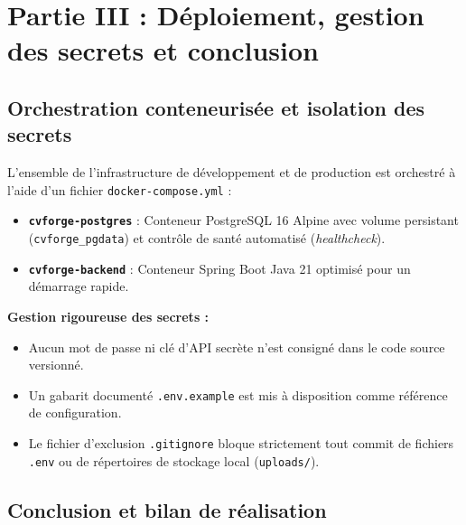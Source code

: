 \documentclass[11pt,a4paper]{article}
\begin{document}
\newpage

\section{Partie III : Déploiement, gestion des secrets et conclusion}

\subsection{Orchestration conteneurisée et isolation des secrets}

L'ensemble de l'infrastructure de développement et de production est orchestré à l'aide d'un fichier \texttt{docker-compose.yml} :
\begin{itemize}
    \item \textbf{\texttt{cvforge-postgres}} : Conteneur PostgreSQL 16 Alpine avec volume persistant (\texttt{cvforge\_pgdata}) et contrôle de santé automatisé (\textit{healthcheck}).
    \item \textbf{\texttt{cvforge-backend}} : Conteneur Spring Boot Java 21 optimisé pour un démarrage rapide.
\end{itemize}

\textbf{Gestion rigoureuse des secrets :}
\begin{itemize}
    \item Aucun mot de passe ni clé d'API secrète n'est consigné dans le code source versionné.
    \item Un gabarit documenté \texttt{.env.example} est mis à disposition comme référence de configuration.
    \item Le fichier d'exclusion \texttt{.gitignore} bloque strictement tout commit de fichiers \texttt{.env} ou de répertoires de stockage local (\texttt{uploads/}).
\end{itemize}

\subsection{Conclusion et bilan de réalisation}
\end{document}
